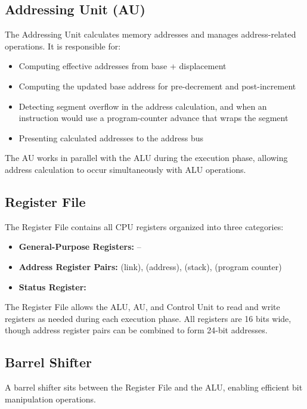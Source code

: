 \subsection{Addressing Unit (AU)}

The Addressing Unit calculates memory addresses and manages address-related operations. It is responsible for:

\begin{itemize}
	\item Computing effective addresses from base + displacement
	\item Computing the updated base address for pre-decrement and post-increment
	\item Detecting segment overflow in the address calculation, and when an instruction would use a program-counter advance that
	      wraps the segment
	\item Presenting calculated addresses to the address bus
\end{itemize}

The AU works in parallel with the ALU during the execution phase, allowing address calculation to occur simultaneously
with ALU operations.

\subsection{Register File}

The Register File contains all CPU registers organized into three categories:

\begin{itemize}
	\item \textbf{General-Purpose Registers:} --
	\item \textbf{Address Register Pairs:}  (link),  (address),  (stack),  (program counter)
	\item \textbf{Status Register:} 
\end{itemize}

The Register File allows the ALU, AU, and Control Unit to read and write registers as needed during each execution
phase. All registers are 16 bits wide, though address register pairs can be combined to form 24-bit addresses.

\subsection{Barrel Shifter}

A barrel shifter sits between the Register File and the ALU, enabling efficient bit manipulation operations.


